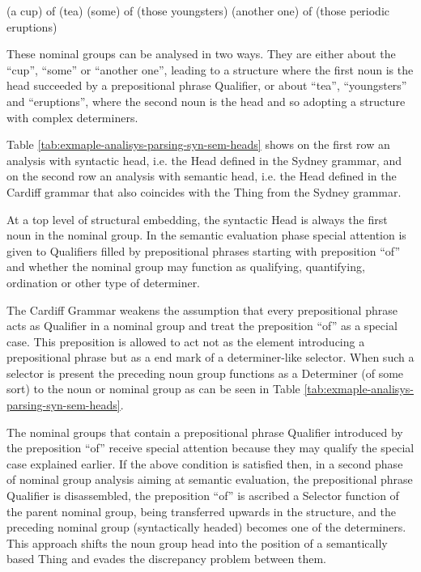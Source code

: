     \begin{exe}
        \ex \label{ex:dectic-ngs} (a cup) of (tea)
        \ex \label{ex:dectic-ngs1}(some) of (those youngsters)
        \ex \label{ex:dectic-ngs2}(another one) of (those periodic eruptions)
    \end{exe}
    
    These nominal groups can be analysed in two ways. They are either about the ``cup'', ``some'' or ``another one'', leading to a structure where the first noun is the head succeeded by a prepositional phrase Qualifier, or about ``tea'', ``youngsters'' and ``eruptions'', where the second noun is the head and so adopting a structure with complex determiners.
    
    Table \ref{tab:exmaple-analisys-parsing-syn-sem-heads} shows on the first row an analysis with syntactic head, i.e. the Head defined in the Sydney grammar, and on the second row an analysis with semantic head, i.e. the Head defined in the Cardiff grammar that also coincides with the Thing from the Sydney grammar.
    
    At a top level of structural embedding, the syntactic Head is always the first noun in the nominal group. In the semantic evaluation phase special attention is given to Qualifiers filled by prepositional phrases starting with preposition ``of'' and whether the nominal group may function as qualifying, quantifying, ordination or other type of determiner. 
    
    The Cardiff Grammar weakens the assumption that every prepositional phrase acts as Qualifier in a nominal group and treat the preposition ``of'' as a special case. This preposition is allowed to act not as the element introducing a prepositional phrase but as a end mark of a determiner-like selector. When such a selector is present the preceding noun group functions as a Determiner (of some sort) to the noun or nominal group as can be seen in Table \ref{tab:exmaple-analisys-parsing-syn-sem-heads}. 
    
    The nominal groups that contain a prepositional phrase Qualifier introduced by the preposition ``of'' receive special attention because they may qualify the special case explained earlier. If the above condition is satisfied then, in a second phase of nominal group analysis aiming at semantic evaluation, the prepositional phrase Qualifier is disassembled, the preposition ``of'' is ascribed a Selector function of the parent nominal group, being transferred upwards in the structure, and the preceding nominal group (syntactically headed) becomes one of the determiners. This approach shifts the noun group head into the position of a semantically based Thing and evades the discrepancy problem between them. 
    
